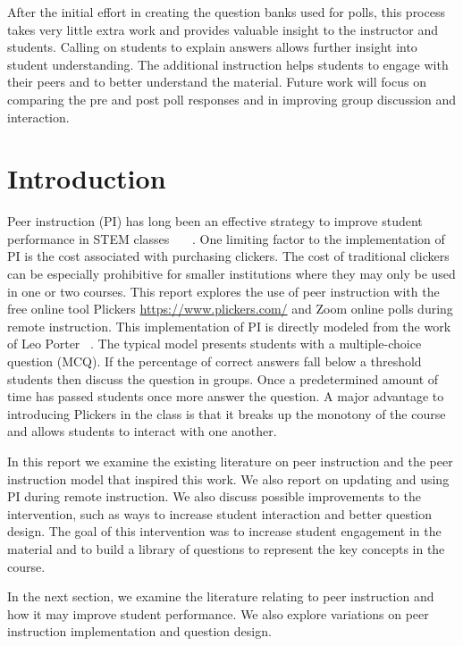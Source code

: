 \documentclass[12pt]{article}
\begin{document}
After the initial effort in creating the question banks used for polls, this process takes very little extra work and provides valuable insight to the instructor and students.  Calling on students to explain answers allows further insight into student understanding.  The  additional instruction helps students to engage with their peers and to better understand the material.  Future work will focus on comparing the pre and post poll responses and in improving group discussion and interaction.
 
\section{Introduction}
Peer instruction (PI) has long been an effective strategy to improve student performance in STEM classes ~\cite{porterMultiinstitutionalStudyPeer2016}~\cite{porterHalvingFailRates2013}~\cite{simonExperienceReportPeer2010a}. One limiting factor to the implementation of PI is the cost associated with purchasing clickers.  The cost of traditional clickers can be especially prohibitive for smaller institutions where they may only be used in one or two courses.  
This report explores the use of peer instruction with the free online tool Plickers \url{https://www.plickers.com/} and Zoom online polls during remote instruction.  
This implementation of PI is directly modeled from the work of Leo Porter ~\cite{porterMultiinstitutionalStudyPeer2016}.  The typical model presents students with a multiple-choice question (MCQ). If the percentage of correct answers fall below a threshold students then discuss the question in groups. Once a predetermined amount of time has passed students once more answer the question.  A major advantage to introducing Plickers in the class is that it breaks up the monotony of the course and allows students to interact with one another.  

In this report we examine the existing literature on peer instruction and the peer instruction model that inspired this work.  We also report on updating and using PI during remote instruction.  We also discuss possible improvements to the intervention, such as ways to increase student interaction and better question design. The goal of this intervention was to increase student engagement in the material and to build a library of questions to represent the key concepts in the course. 

In the next section, we examine the literature relating to peer instruction and how it may improve student performance.  We also explore variations on peer instruction implementation and question design. 
\end{document}
